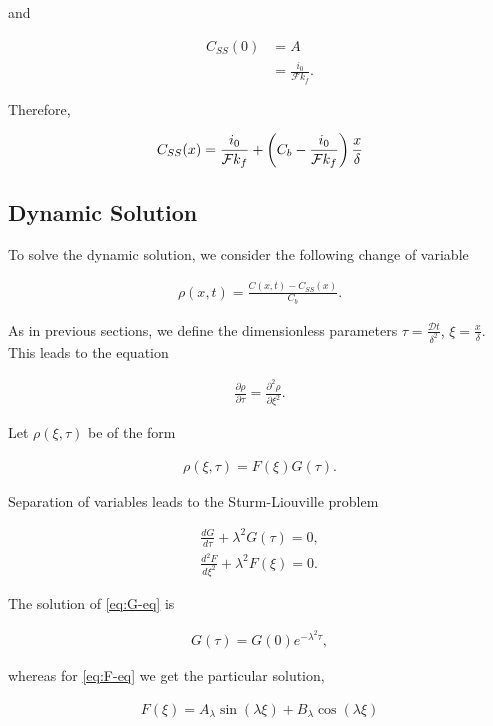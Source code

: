 and

\begin{align}
	C_{SS}(0) &= A \\
	&= \frac{i_0}{\mathcal{F} k_f}.
\end{align}

Therefore,

\begin{align}
	C_{SS} (x) = \frac{i_0}{\mathcal{F}k_f} +\left({C_b - \frac{i_0}{\mathcal{F}k_f}}\right)\frac{x}{\delta}
\end{align}

\subsection{Dynamic Solution}

To solve the dynamic solution, we consider the following change of variable

\begin{align}
	\rho(x, t) = \frac{C(x,t)-C_{SS}(x)}{C_b}.
\end{align}

As in previous sections, we define the dimensionless parameters $\tau = \frac{\mathcal{D} t}{\delta^2}$, $\xi = \frac{x}{\delta}$. This leads to the equation

\begin{align}
	\frac{\partial \rho}{\partial \tau} = \frac{\partial^2 \rho}{\partial \xi^2}.
\end{align}

Let $\rho(\xi, \tau)$ be of the form

\begin{align}
	\rho(\xi, \tau) = F(\xi)G(\tau).
\end{align}


Separation of variables leads to the Sturm-Liouville problem

\begin{align}
	\frac{d G}{d \tau} + \lambda^2G(\tau) = 0,
	\label{eq:G-eq}\\
	\frac{d^2 F}{d\xi^2} + \lambda^2 F(\xi) = 0.
	\label{eq:F-eq}
\end{align}


The solution of \ref{eq:G-eq} is 

\begin{align}
	G(\tau) = G(0) e^{-\lambda^2 \tau},
\end{align}

whereas for \ref{eq:F-eq} we get the particular solution,

\begin{align}
	F(\xi) = A_\lambda\sin(\lambda \xi) + B_\lambda\cos(\lambda \xi)
\end{align}

